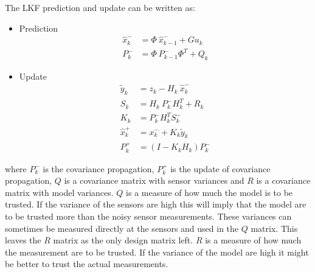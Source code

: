 The \ac{LKF} prediction and update can be written as:
\begin{itemize}
\item Prediction
\begin{align}
\hat x_k^- &= \Phi\ \hat x_{k-1}^- + G u_k \\
P_k^- &= \Phi\ P_{k-1}^- \Phi^T + Q_{k}
\end{align}

\item Update
\begin{align}
\tilde y_k &= z_k - H_k\ \hat x_k^-\\
S_k &= H_k\ P_k^-H_k^T + R_k\\
K_k &= P_k^-H_k^TS_k^-\\
\hat x_k^+ &= x_k^- + K_k \tilde y_k\\
P_k^+ &= (I - K_k H_k) P_k^-
\end{align}
\end{itemize}
%
where $P_{k}^-$ is the covariance propagation, $P_{k}^+$ is the update of covariance propagation, $Q$ is a covariance matrix with sensor variances and $R$ is a covariance matrix with model variances. $Q$ is a measure of how much the model is to be trusted. If the variance of the sensors are high this will imply that the model are to be trusted more than the noisy sensor measurements. These variances can sometimes be measured directly at the sensors and used in the $Q$ matrix. This leaves the $R$ matrix as the only design matrix left. $R$ is a measure of how much the measurement are to be trusted. If the variance of the model are high it might be better to trust the actual measurements.


